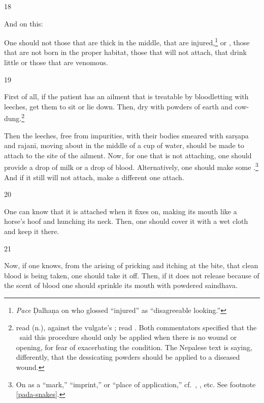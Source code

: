 \begin{translation}
\item[18]

And on this:

\begin{sloka}
    One should not  those that are thick in the middle, that are
injured,\footnote{\emph{Pace} Ḍalhaṇa on  who glossed
     “injured” as  “disagreeable
    looking.”} or , those that are not born in the proper habitat,
    those that will not attach, that drink little or those that are venomous.
\end{sloka}

\item[19] 

First of all, if the patient  has an ailment that is treatable by bloodletting
with leeches, get them to sit or lie down.  Then, dry  with powders of earth and 
    cow-dung.\footnote{ read
     (n.), against the vulgate's ; 
    read . Both commentators specified that the \SS\ said this 
    procedure
    should only be applied when there is no wound or opening, for fear of
    exacerbating the condition.  The Nepalese text is saying, differently, that the
    dessicating powders should be applied to a diseased wound. }  
    
    
Then the leeches, free from impurities, with their bodies smeared with
\gls{sarṣapa} and \gls{rajanī}, moving about in the middle of a cup of water,
should be made to attach to the site of the ailment.  Now, for one that is not
attaching, one should provide a drop of milk or a drop of blood. Alternatively,
one should make some .\footnote{\label{pada-leeches}On  as a “mark,” “imprint,” 
    or
    “place of application,” cf.\ , , etc.  See
    footnote \ref{pada-snakes}.} And if it still will not attach, make a different 
    one
    attach.

\item [20]
 
One can know that it is attached when it fixes on, making its mouth like a 
horse's hoof and hunching its neck. Then, one should cover it with a wet
cloth and keep it there.
 
 \item[21]
 
Now, if one knows, from the arising of pricking and itching at the
bite, that clean blood is being taken, one should take it off.  Then,
if it does not release because of the scent of blood one should sprinkle its
mouth with powdered \gls{saindhava}.
    

\end{translation}
